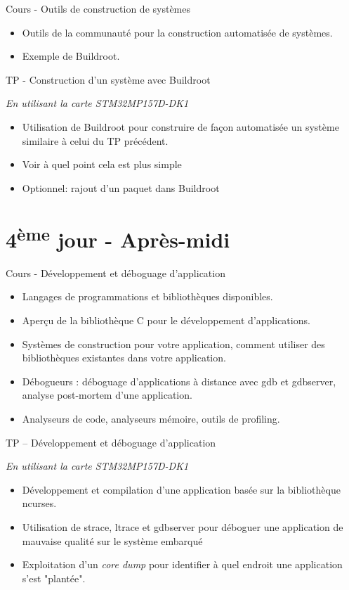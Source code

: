 \documentclass[a4paper,12pt,obeyspaces,spaces,hyphens]{article}
\begin{document}
\feagendatwocolumn
{Cours - Outils de construction de systèmes}
{
  \begin{itemize}
  \item Outils de la communauté pour la construction
	automatisée de systèmes.
  \item Exemple de Buildroot.
  \end{itemize}
}
{TP - Construction d'un système avec Buildroot}
{
  {\em En utilisant la carte STM32MP157D-DK1}
  \begin{itemize}
  \item Utilisation de Buildroot pour construire de façon automatisée
	un système similaire à celui du TP précédent.
  \item Voir à quel point cela est plus simple
  \item Optionnel: rajout d'un paquet dans Buildroot
  \end{itemize}
}

\section{4\textsuperscript{ème} jour - Après-midi}

\feagendaonecolumn
{Cours - Développement et déboguage d'application}
{
  \begin{itemize}
  \item Langages de programmations et bibliothèques disponibles.
  \item Aperçu de la bibliothèque C pour le développement d'applications.
  \item Systèmes de construction pour votre application, comment utiliser des
	bibliothèques existantes dans votre application.
  \item Débogueurs : déboguage d'applications à distance avec gdb et gdbserver, analyse
	post-mortem d'une application.
  \item Analyseurs de code, analyseurs mémoire, outils de profiling.
  \end{itemize}
}

\feagendaonecolumn
{TP – Développement et déboguage d'application}
{
  {\em En utilisant la carte STM32MP157D-DK1}
  \begin{itemize}
  \item Développement et compilation d'une application basée sur la bibliothèque
	ncurses.
  \item Utilisation de strace, ltrace et gdbserver pour déboguer une application de
	mauvaise qualité sur le système embarqué
  \item Exploitation d'un {\em core dump} pour identifier à quel endroit
        une application s'est "plantée".
  \end{itemize}
}
\end{document}
